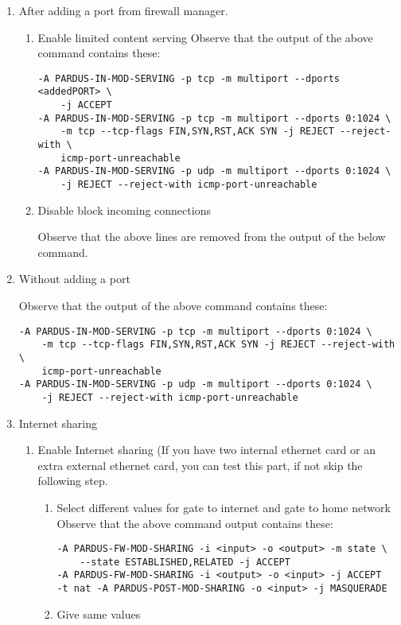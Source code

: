 \documentclass[a4paper,10pt]{article}
\begin{document}
\begin{enumerate}
\begin{enumerate}
     \item After adding a port from firewall manager.
        \begin{enumerate}
        \item Enable limited content serving
            	Observe that the output of the above command contains these: 
\begin{verbatim}
-A PARDUS-IN-MOD-SERVING -p tcp -m multiport --dports <addedPORT> \
    -j ACCEPT
-A PARDUS-IN-MOD-SERVING -p tcp -m multiport --dports 0:1024 \
    -m tcp --tcp-flags FIN,SYN,RST,ACK SYN -j REJECT --reject-with \
    icmp-port-unreachable
-A PARDUS-IN-MOD-SERVING -p udp -m multiport --dports 0:1024 \
    -j REJECT --reject-with icmp-port-unreachable
\end{verbatim} 
        \item Disable block incoming connections

              Observe that the above lines are removed from the output of the below command.
        \end{enumerate}
    \item Without adding a port

        Observe that the output of the above command contains these:

\begin{verbatim}
-A PARDUS-IN-MOD-SERVING -p tcp -m multiport --dports 0:1024 \
    -m tcp --tcp-flags FIN,SYN,RST,ACK SYN -j REJECT --reject-with \
    icmp-port-unreachable
-A PARDUS-IN-MOD-SERVING -p udp -m multiport --dports 0:1024 \
    -j REJECT --reject-with icmp-port-unreachable
\end{verbatim} 


\item Internet sharing
    \begin{enumerate}
    \item Enable Internet sharing
    	(If you have two internal ethernet card or an extra external ethernet card, you can test this part, if not skip the following step.
        \begin{enumerate}

        \item Select different values for gate to internet and gate to home network
            	Observe that the above command output contains these:
\begin{verbatim}
-A PARDUS-FW-MOD-SHARING -i <input> -o <output> -m state \
    --state ESTABLISHED,RELATED -j ACCEPT
-A PARDUS-FW-MOD-SHARING -i <output> -o <input> -j ACCEPT
-t nat -A PARDUS-POST-MOD-SHARING -o <input> -j MASQUERADE
\end{verbatim} 
        \item Give same values


\end{enumerate}
\end{enumerate}
\end{enumerate}
\end{enumerate}
\end{document}
